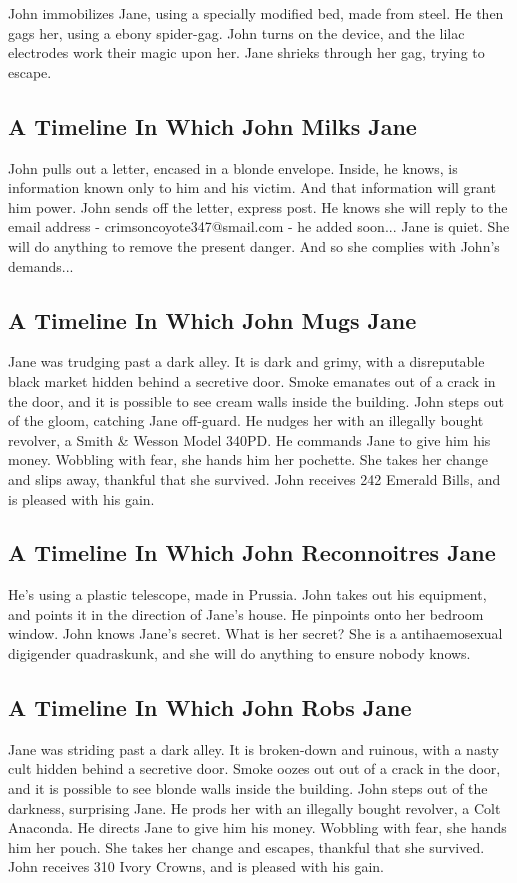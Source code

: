 \documentclass{article}
\begin{document}
John immobilizes Jane, using a specially modified bed, made from steel.
He then gags her, using a ebony spider{-}gag.
John turns on the device, and the lilac electrodes work their magic upon her.
Jane shrieks through her gag, trying to escape.
\subsection{A Timeline In Which John Milks Jane}


John pulls out a letter, encased in a blonde envelope. Inside, he knows, is information known only to him and his victim. And that information will grant him power.
John sends off the letter, express post. He knows she will reply to the email address {-} crimsoncoyote347@smail.com {-} he added soon...
Jane is quiet. She will do anything to remove the present danger. And so she complies with John's demands...
\subsection{A Timeline In Which John Mugs Jane}


Jane was trudging past a dark alley.
It is dark and grimy, with a disreputable black market hidden behind a secretive door.
Smoke emanates out of a crack in the door, and it is possible to see cream walls inside the building.
John steps out of the gloom, catching Jane off{-}guard.
He nudges her with an illegally bought revolver, a Smith \& Wesson Model 340PD.
He commands Jane to give him his money.
Wobbling with fear, she hands him her pochette.
She takes her change and slips away, thankful that she survived.
John receives 242 Emerald Bills, and is pleased with his gain.
\subsection{A Timeline In Which John Reconnoitres Jane}


He's using a plastic telescope, made in Prussia.
John takes out his equipment, and points it in the direction of Jane's house. He pinpoints onto her bedroom window.
John knows Jane's secret. What is her secret? She is a antihaemosexual digigender quadraskunk, and she will do anything to ensure nobody knows.
\subsection{A Timeline In Which John Robs Jane}


Jane was striding past a dark alley.
It is broken{-}down and ruinous, with a nasty cult hidden behind a secretive door.
Smoke oozes out out of a crack in the door, and it is possible to see blonde walls inside the building.
John steps out of the darkness, surprising Jane.
He prods her with an illegally bought revolver, a Colt Anaconda.
He directs Jane to give him his money.
Wobbling with fear, she hands him her pouch.
She takes her change and escapes, thankful that she survived.
John receives 310 Ivory Crowns, and is pleased with his gain.
\end{document}
